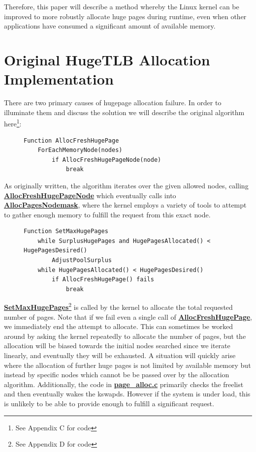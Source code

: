 \documentclass{article}
\begin{document}
Therefore, this paper will describe a method whereby the Linux kernel can be improved to more robustly allocate huge pages during runtime, even when other applications have consumed a significant amount of available memory.

\newpage
\section{Original HugeTLB Allocation Implementation}
	There are two primary causes of hugepage allocation failure. In order to illuminate them and discuss the solution we will describe the original algorithm here\footnote{See Appendix C for code}:
\begin{figure}[h]
\begin{verbatim}
Function AllocFreshHugePage
    ForEachMemoryNode(nodes)
        if AllocFreshHugePageNode(node)
            break
\end{verbatim}
\end{figure}

As originally written, the algorithm iterates over the given allowed nodes, calling \href{http://lxr.free-electrons.com/source/mm/hugetlb.c?v=3.10#L693}{\textbf{AllocFreshHugePageNode}} which eventually calls into \href{http://lxr.free-electrons.com/source/mm/page_alloc.c?v=3.10#L2600}{\textbf{AllocPagesNodemask}}, where the kernel employs a variety of tools to attempt to gather enough memory to fulfill the request from this exact node. 

\begin{figure}[h]
\begin{verbatim}
Function SetMaxHugePages
    while SurplusHugePages and HugePagesAllocated() < HugePagesDesired()
        AdjustPoolSurplus
    while HugePagesAllocated() < HugePagesDesired()
        if AllocFreshHugePage() fails
            break
\end{verbatim}
\end{figure}

\href{http://lxr.free-electrons.com/source/mm/hugetlb.c?v=3.10#L1386}{\textbf{SetMaxHugePages}}\footnote{See Appendix D for code} is called by the kernel to allocate the total requested number of pages. Note that if we fail even a single call of \href{http://lxr.free-electrons.com/source/mm/hugetlb.c?v=3.10#L758}{\textbf{AllocFreshHugePage}}, we immediately end the attempt to allocate. This can sometimes be worked around by asking the kernel repeatedly to allocate the number of pages, but the allocation will be biased towards the initial nodes searched since we iterate linearly, and eventually they will be exhausted. A situation will quickly arise where the allocation of further huge pages is not limited by available memory but instead by specific nodes which cannot be be passed over by the allocation algorithm. Additionally, the code in \href{http://lxr.free-electrons.com/source/mm/page_alloc.c?v=3.10}{\textbf{page\_alloc.c}} primarily checks the freelist and then eventually wakes the kswapds. However if the system is under load, this is unlikely to be able to provide enough to fulfill a significant request.
\end{document}
